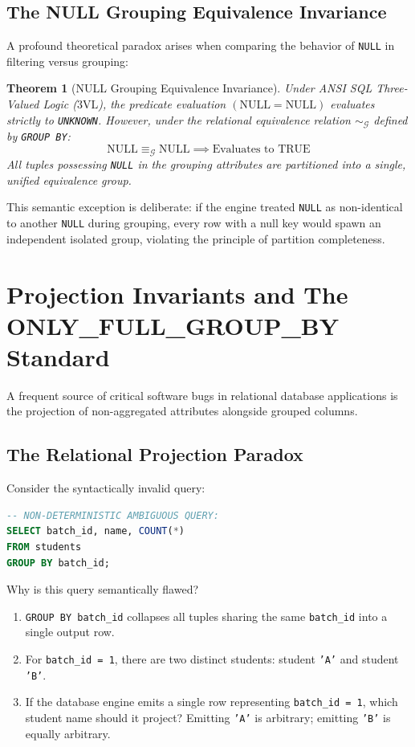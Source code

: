 \documentclass[10pt,twocolumn,letterpaper]{article}
\newtheorem{theorem}{Theorem}
\begin{document}
\subsection{The NULL Grouping Equivalence Invariance}
A profound theoretical paradox arises when comparing the behavior of \texttt{NULL} in filtering versus grouping:
\begin{theorem}[NULL Grouping Equivalence Invariance]
Under ANSI SQL Three-Valued Logic ($3\text{VL}$), the predicate evaluation $(\text{NULL} = \text{NULL})$ evaluates strictly to \texttt{UNKNOWN}. However, under the relational equivalence relation $\sim_{\mathcal{G}}$ defined by \texttt{GROUP BY}:
\begin{equation}
\text{NULL} \equiv_{\mathcal{G}} \text{NULL} \implies \text{Evaluates to TRUE}
\end{equation}
All tuples possessing \texttt{NULL} in the grouping attributes are partitioned into a single, unified equivalence group.
\end{theorem}
This semantic exception is deliberate: if the engine treated \texttt{NULL} as non-identical to another \texttt{NULL} during grouping, every row with a null key would spawn an independent isolated group, violating the principle of partition completeness.

\section{Projection Invariants and The ONLY\_FULL\_GROUP\_BY Standard}
\label{sec:only_full_group_by}

A frequent source of critical software bugs in relational database applications is the projection of non-aggregated attributes alongside grouped columns.

\subsection{The Relational Projection Paradox}
Consider the syntactically invalid query:
\begin{lstlisting}[language=SQL]
-- NON-DETERMINISTIC AMBIGUOUS QUERY:
SELECT batch_id, name, COUNT(*)
FROM students
GROUP BY batch_id;
\end{lstlisting}

Why is this query semantically flawed?
\begin{enumerate}
    \item \texttt{GROUP BY batch\_id} collapses all tuples sharing the same \texttt{batch\_id} into a single output row.
    \item For \texttt{batch\_id = 1}, there are two distinct students: student \texttt{'A'} and student \texttt{'B'}.
    \item If the database engine emits a single row representing \texttt{batch\_id = 1}, which student name should it project? Emitting \texttt{'A'} is arbitrary; emitting \texttt{'B'} is equally arbitrary.
\end{enumerate}
\end{document}
